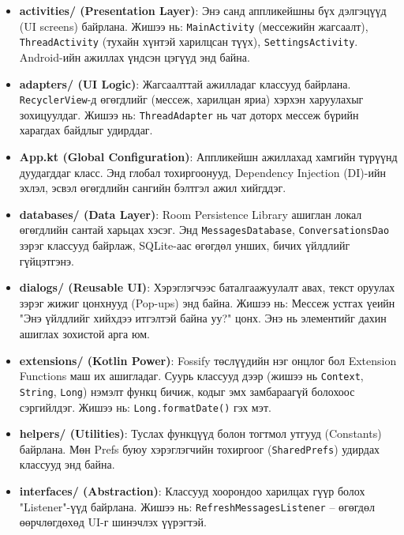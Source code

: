 \begin{itemize}
    \item \textbf{activities/ (Presentation Layer)}: Энэ санд аппликейшны бүх дэлгэцүүд (UI screens) байрлана. Жишээ нь: \texttt{MainActivity} (мессежийн жагсаалт), \texttt{ThreadActivity} (тухайн хүнтэй харилцсан түүх), \texttt{SettingsActivity}. Android-ийн ажиллах үндсэн цэгүүд энд байна.

    \item \textbf{adapters/ (UI Logic)}: Жагсаалттай ажилладаг классууд байрлана. \texttt{RecyclerView}-д өгөгдлийг (мессеж, харилцан яриа) хэрхэн харуулахыг зохицуулдаг. Жишээ нь: \texttt{ThreadAdapter} нь чат доторх мессеж бүрийн харагдах байдлыг удирддаг.

    \item \textbf{App.kt (Global Configuration)}: Аппликейшн ажиллахад хамгийн түрүүнд дуудагддаг класс. Энд глобал тохиргоонууд, Dependency Injection (DI)-ийн эхлэл, эсвэл өгөгдлийн сангийн бэлтгэл ажил хийгддэг.

    \item \textbf{databases/ (Data Layer)}: Room Persistence Library ашиглан локал өгөгдлийн сантай харьцах хэсэг. Энд \texttt{MessagesDatabase}, \texttt{ConversationsDao} зэрэг классууд байрлаж, SQLite-аас өгөгдөл унших, бичих үйлдлийг гүйцэтгэнэ.

    \item \textbf{dialogs/ (Reusable UI)}: Хэрэглэгчээс баталгаажуулалт авах, текст оруулах зэрэг жижиг цонхнууд (Pop-ups) энд байна. Жишээ нь: Мессеж устгах үеийн "Энэ үйлдлийг хийхдээ итгэлтэй байна уу?" цонх. Энэ нь элементийг дахин ашиглах \cite{design_patterns} зохистой арга юм.

    \item \textbf{extensions/ (Kotlin Power)}: Fossify төслүүдийн нэг онцлог бол Extension Functions маш их ашигладаг. Суурь классууд дээр (жишээ нь \texttt{Context}, \texttt{String}, \texttt{Long}) нэмэлт функц бичиж, кодыг эмх замбараагүй болохоос сэргийлдэг. Жишээ нь: \texttt{Long.formatDate()} гэх мэт.

    \item \textbf{helpers/ (Utilities)}: Туслах функцүүд болон тогтмол утгууд (Constants) байрлана. Мөн Prefs буюу хэрэглэгчийн тохиргоог (\texttt{SharedPrefs}) удирдах классууд энд байна.

    \item \textbf{interfaces/ (Abstraction)}: Классууд хоорондоо харилцах гүүр болох "Listener"-үүд байрлана. Жишээ нь: \texttt{RefreshMessagesListener} – өгөгдөл өөрчлөгдөхөд UI-г шинэчлэх үүрэгтэй.


\end{itemize}
